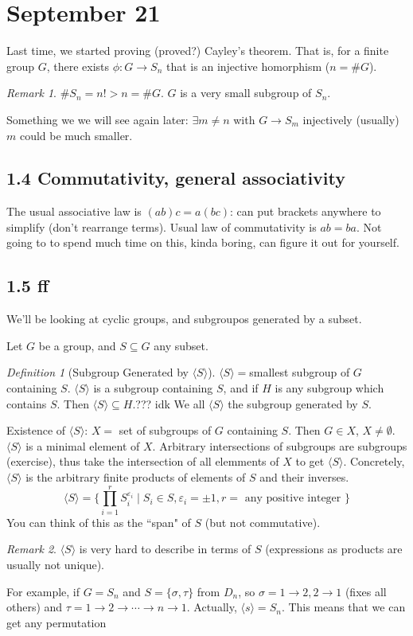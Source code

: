 \documentclass{article}
\theoremstyle{plain}
\theoremstyle{remark}
\newtheorem{definition}{Definition}
\newtheorem{remark}{Remark}
\newcommand{\ep}{{\varepsilon}}
\begin{document}
\section{September 21}
Last time, we started proving (proved?) Cayley's theorem.
That is, for a finite group $G$, there exists $\phi \colon G \to S_n$
that is an injective homorphism ($n = \#G$).
\begin{remark}
	$\# S_n = n! > n = \#G$.
	$G$ is a very small subgroup of $S_n$.
\end{remark}
Something we we will see again later:
$\exists m \neq n$ with $G \to S_m$ injectively (usually)
$m$ could be much smaller.

\subsection{1.4 Commutativity, general associativity}
The usual associative law is $(ab)c = a(bc)$:
can put brackets anywhere to simplify (don't rearrange terms).
Usual law of commutativity is $ab = ba$.
Not going to to spend much time on this, kinda boring,
can figure it out for yourself.

\subsection{1.5 ff}
We'll be looking at cyclic groups, and  subgroupos generated by a subset.

Let $G$ be a group, and $S \subseteq G$ any subset.
\begin{definition}[Subgroup Generated by $\langle S \rangle$]
	$\langle S \rangle = $smallest subgroup of $G$ containing $S$.
	$\langle S \rangle$ is a subgroup containing $S$,
	and if $H$ is any subgroup which contains $S$.
	Then $\langle S \rangle \subseteq H$.??? idk
	We all $\langle S \rangle$ the subgroup generated by $S$.
\end{definition}
Existence of $\langle S \rangle$:
$X = $ set of subgroups of $G$ containing $S$.
Then $G \in X$, $X \neq \emptyset$.
$\langle S \rangle$ is a minimal element of $X$.
Arbitrary intersections of subgroups are subgroups (exercise),
thus take the intersection of all elemments of $X$ to get $\langle S \rangle$.
Concretely, $\langle S \rangle$ is the arbitrary finite products
of elements of $S$ and their inverses.
\[\langle S \rangle = \{\prod_{i=1}^r S_i^{\ep_i} \mid S_i \in S, \ep_i = \pm 1,
	r = \text{ any positive integer }\}
\]
You can think of this as the ``span" of $S$ (but not commutative).
\begin{remark}
	$\langle S \rangle$ is very hard to describe in terms of $S$
	(expressions as products are usually not unique).
\end{remark}
For example, if $G = S_n$ and $S = \{\sigma, \tau\}$
from $D_n$, so $\sigma = 1\to2, 2 \to 1$ (fixes all others)
and $\tau = 1\to 2\to \cdots \to n \to 1$.
Actually, $\langle s \rangle = S_n$.
This means that we can get any permutation
\end{document}
